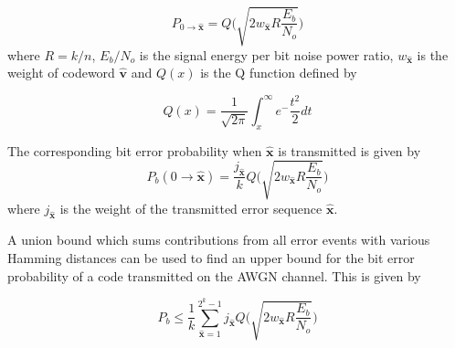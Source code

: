 \documentclass[20 pts]{article}
\begin{document}
      \begin{equation}
    P_{0 \rightarrow \hat{\mathbf{x}} }=Q\Bigg( \sqrt{2w_{\hat{\mathbf{x}}}
    R\frac{E_b}{N_o}} \Bigg )
    \label{pd2}
    \end{equation}
     where $R=k/n$, $E_b/N_o$  is the signal energy per bit noise power ratio,
    $ w_{\hat{\mathbf{x}}}$ is the weight of codeword $\hat{\mathbf{v}}$ and 
     $Q(x)$
     is the Q function defined by
     
     \begin{equation}
     Q(x) =\frac{1}{\sqrt{2\pi}} \int_{x}^{\infty} e^-\frac{t^2}{2} dt
     \end{equation}
     
    
    
    
    The corresponding bit error probability when $\hat{\mathbf{x}}$ is transmitted
    is given by 
    \begin{equation}
     P_b(0 \rightarrow \hat{\mathbf{x}} )=\frac{ j_{\hat{\mathbf{x}}}}{k}Q\Bigg
     ( \sqrt{2w_{\hat{\mathbf{x}}}
    R\frac{E_b}{N_o}} \Bigg )
     \end{equation}
    where $j_{\hat{\mathbf{x}}}$ is the weight of the transmitted error sequence 
    $\hat{\mathbf{x}}$.
    
        A union bound which sums contributions from all error events with various 
        Hamming
    distances can be used to find an upper bound for the bit error probability 
    of a code transmitted on the AWGN channel. This is given by 
    
     \begin{equation}
     P_b \leq \frac{1}{k}\sum_{\hat{\mathbf{x}}=1}^{2^k-1} j_{\hat{\mathbf{x}}}
     Q\Bigg ( \sqrt{2w_{\hat{\mathbf{x}}}
    R\frac{E_b}{N_o}} \Bigg )
    \label{BER}
     \end{equation}
     
\end{document}
